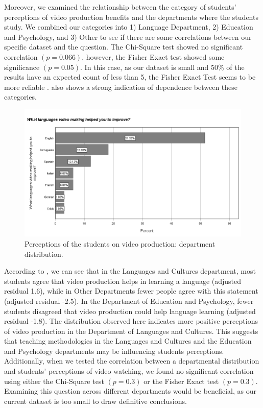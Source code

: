Moreover, we examined the relationship between the category of students'
perceptions of video production benefits and the departments where the
students study. We combined our categories into 1) Language Department,
2) Education and Psychology, and 3) Other to see if there are some
correlations between our specific dataset and the question. The
Chi-Square test showed no significant correlation $(p= 0.066)$, however,
the Fisher Exact test showed some significance $(p = 0.05)$. In this case,
as our dataset is small and 50\% of the results have an expected count
of less than 5, the Fisher Exact Test seems to be more reliable \cite{jung2014}.
 also shows a strong indication of dependence between
these categories.

\begin{figure}[htbp]
\centering
\begin{minipage}{\textwidth}
\includegraphics[width=\textwidth]{Fig-4.png}
\caption{Perceptions of the students on video production:
	department distribution.}
\label{fig-04}
\end{minipage}
\end{figure}

According to , we can see that in the Languages and Cultures
department, most students agree that video production helps in learning
a language (adjusted residual 1.6), while in Other Departments fewer
people agree with this statement (adjusted residual -2.5). In the
Department of Education and Psychology, fewer students disagreed that
video production could help language learning (adjusted residual -1.8).
The distribution observed here indicates more positive perceptions of
video production in the Department of Languages and Cultures. This
suggests that teaching methodologies in the Languages and Cultures and
the Education and Psychology departments may be influencing
students\textquotesingle{} perceptions. Additionally, when we tested the
correlation between a departmental distribution and students'
perceptions of video watching, we found no significant correlation using
either the Chi-Square test $(p=0.3)$ or the Fisher Exact test $(p=0.3)$.
Examining this question across different departments would be
beneficial, as our current dataset is too small to draw definitive
conclusions.

